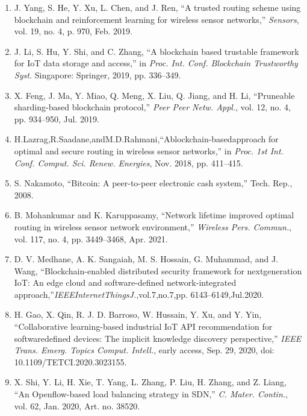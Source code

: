 \documentclass{article} %
\begin{document}
\begin{enumerate}
\item  J. Yang, S. He, Y. Xu, L. Chen, and J. Ren, ``A trusted routing scheme using blockchain and reinforcement learning for wireless sensor networks,'' \textit{Sensors}, vol. 19, no. 4, p. 970, Feb. 2019.

\item  J. Li, S. Hu, Y. Shi, and C. Zhang, ``A blockchain based trustable framework for IoT data storage and access,'' in \textit{Proc. Int. Conf. Blockchain Trustworthy Syst. }Singapore: Springer, 2019, pp. 336--349.

\item  X. Feng, J. Ma, Y. Miao, Q. Meng, X. Liu, Q. Jiang, and H. Li, ``Pruneable sharding-based blockchain protocol,'' \textit{Peer Peer Netw. Appl.}, vol. 12, no. 4, pp. 934--950, Jul. 2019.

\item  H.Lazrag,R.Saadane,andM.D.Rahmani,``Ablockchain-basedapproach for optimal and secure routing in wireless sensor networks,'' in \textit{Proc. 1st Int. Conf. Comput. Sci. Renew. Energies}, Nov. 2018, pp. 411--415.

\item  S. Nakamoto, ``Bitcoin: A peer-to-peer electronic cash system,'' Tech. Rep., 2008.

\item  B. Mohankumar and K. Karuppasamy, ``Network lifetime improved optimal routing in wireless sensor network environment,'' \textit{Wireless Pers. Commun.}, vol. 117, no. 4, pp. 3449--3468, Apr. 2021.

\item  D. V. Medhane, A. K. Sangaiah, M. S. Hossain, G. Muhammad, and J. Wang, ``Blockchain-enabled distributed security framework for nextgeneration IoT: An edge cloud and software-defined network-integrated approach,''\textit{IEEEInternetThingsJ.},vol.7,no.7,pp. 6143--6149,Jul.2020.

\item  H. Gao, X. Qin, R. J. D. Barroso, W. Hussain, Y. Xu, and Y. Yin, ``Collaborative learning-based industrial IoT API recommendation for softwaredefined devices: The implicit knowledge discovery perspective,'' \textit{IEEE Trans. Emerg. Topics Comput. Intell.}, early access, Sep. 29, 2020, doi: 10.1109/TETCI.2020.3023155.

\item  X. Shi, Y. Li, H. Xie, T. Yang, L. Zhang, P. Liu, H. Zhang, and Z. Liang, ``An Openflow-based load balancing strategy in SDN,'' \textit{C. Mater. Contin.}, vol. 62, Jan. 2020, Art. no. 38520.


\end{enumerate}
\end{document}
